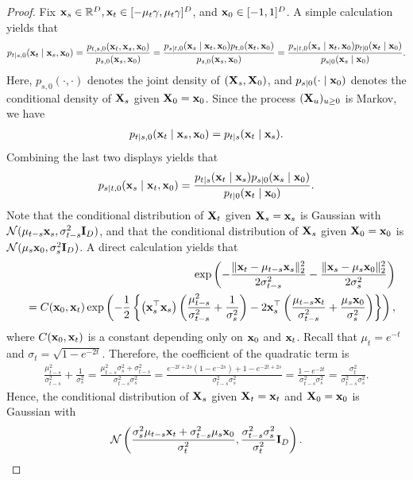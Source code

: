 \documentclass[11pt,a4paper,final]{article}
\numberwithin{equation}{section}
\theoremstyle{remark}
\def\cN{\mathcal N}
\newcommand{\bI}{{\bf I}}
\newcommand{\bx}{{\bf x}}
\newcommand{\bX}{{\bf X}}
\newcommand{\bbR}{{\mathbb R}}
\newcommand{\be}{\begin{equation}}
\newcommand{\ee}{\end{equation}}
\newcommand{\bean}{\setlength\arraycolsep{1pt}\begin{eqnarray*}}
\newcommand{\eean}{\end{eqnarray*}}
\begin{document}
\begin{proof}
Fix $ \bx_{s} \in \bbR^{D}, \bx_{t} \in [-\mu_{t}\gamma, \mu_{t}\gamma]^{D}$, and $ \bx_{0}\in [-1,1]^{D}$.
A simple calculation yields that
\bean
p_{t \mid s,0} (\bx_{t} \mid \bx_{s}, \bx_{0})
= \frac{p_{t,s,0} (\bx_{t},\bx_{s},\bx_{0}) }{ p_{s,0} (\bx_{s}, \bx_{0}) }
= \frac{ p_{s \mid t,0} (\bx_{s} \mid \bx_{t}, \bx_{0}) p_{t,0} (\bx_{t}, \bx_{0})  }{ p_{s,0} (\bx_{s}, \bx_{0}) }
= \frac{p_{s \mid t,0} (\bx_{s} \mid \bx_{t}, \bx_{0}) p_{t \mid 0} (\bx_{t} \mid \bx_{0})  }{ p_{s \mid 0} (\bx_{s} \mid \bx_{0}) }.
\eean
Here, $p_{s,0}(\cdot,\cdot)$ denotes the joint density of $(\bX_{s},\bX_{0})$, and $p_{s \mid 0}(\cdot \mid \bx_{0})$ denotes the conditional density of $\bX_{s}$ given $\bX_{0} = \bx_{0}$.
Since the process $(\bX_{u})_{u \geq 0}$ is Markov, we have
\bean
p_{t \mid s,0} (\bx_{t} \mid \bx_{s}, \bx_{0}) 
= p_{t \mid s} (\bx_{t} \mid \bx_{s}).
\eean
Combining the last two displays yields that
\bean
p_{s \mid t,0} ( \bx_{s} \mid \bx_{t}, \bx_{0} ) 
=
\frac{p_{t \mid s} (\bx_{t} \mid \bx_{s})  p_{s \mid 0} (\bx_{s} \mid \bx_{0})}{p_{t \mid 0} (\bx_{t} \mid \bx_{0})}.
\eean
Note that the conditional distribution of $\bX_{t} $ given $\bX_{s} = \bx_{s}$ is Gaussian with $\cN ( \mu_{t-s} \bx_{s}, \sigma_{t-s}^2 \bI_{D} ) $, and that the conditional distribution of $\bX_{s}$ given $\bX_{0} = \bx_0$ is $\cN (\mu_{s} \bx_{0}, \sigma_{s}^2 \bI_{D})$.
A direct calculation yields that
\bean
&& \exp \left( - \frac{  \| \bx_{t} - \mu_{t-s} \bx_{s} \|_2^2 }{ 2 \sigma_{t-s}^2 }
- \frac{  \| \bx_{s} - \mu_{s} \bx_{0} \|_2^2 }{ 2 \sigma_{s}^2 } \right)
\\
&& = C(\bx_{0},\bx_{t}) \exp \left( -\frac{1}{2} \left\{ \left( \bx_{s}^{\top} \bx_{s} \right) \left( \frac{\mu_{t-s}^2}{\sigma_{t-s}^2} + \frac{1}{\sigma_{s}^2} \right)
- 2 \bx_{s}^{\top}  \left( \frac{\mu_{t-s} \bx_{t}} {\sigma_{t-s}^2} + \frac{\mu_{s} \bx_{0 }}{\sigma_{s}^2} \right) \right\} \right),
\eean
where $C(\bx_{0},\bx_{t})$ is a constant depending only on $\bx_{0}$ and $\bx_{t}$.
Recall that $\mu_{t} = e^{-t}$ and $\sigma_{t} = \sqrt{1 - e^{-2t}}$.
Therefore, the coefficient of the quadratic term is
\bean
\frac{\mu_{t-s}^2}{\sigma_{t-s}^2} + \frac{1}{\sigma_{s}^2} 
= \frac{\mu_{t-s}^2 \sigma_{s}^2 + \sigma_{t-s}^2 }{ \sigma_{t-s}^2 \sigma_{s}^2}
= \frac{e^{- 2t + 2s} (1-e^{- 2s}) + 1 - e^{- 2t+ 2s} }{ \sigma_{t-s}^2 \sigma_{s}^2}
= \frac{ 1 - e^{-2t} }{ \sigma_{t-s}^2 \sigma_{s}^2}
= \frac{ \sigma_{t}^2 }{ \sigma_{t-s}^2 \sigma_{s}^2}.
\eean
Hence, the conditional distribution of $\bX_{s}$ given $\bX_{t} = \bx_{t}$ and $\bX_{0} = \bx_{0}$ is Gaussian with
\be
\cN
\left( \frac{ \sigma_{s}^2 \mu_{t-s} \bx_{t} + \sigma_{t-s}^2 \mu_{s} \bx_{0 } }{\sigma_{t}^2}  , \frac{ \sigma_{t-s}^2 \sigma_{s}^2 }{\sigma_{t}^2} \bI_{D}
\right).
\label{eqthm2:gaussian}
\ee


\end{proof}
\end{document}
